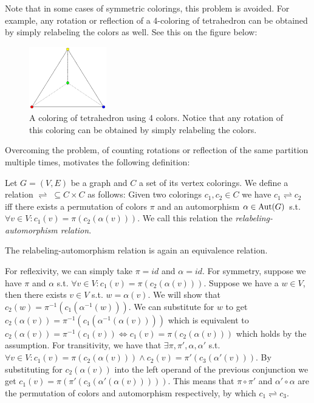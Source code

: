 Note that in some cases of symmetric colorings, this problem is avoided. For example, any rotation or reflection of a 4-coloring of tetrahedron can be obtained by simply relabeling the colors as well. See this on the figure below:

\begin{figure}[H]
    \centering
    \includegraphics[width=0.3\textwidth]{Resources/Figs/example-tetrahedron-4-clring.pdf}
    \caption{A coloring of tetrahedron using 4 colors. Notice that any rotation of this coloring can be obtained by simply relabeling the colors.}
    \label{fig:example-tetrahedron-4-coloring}
\end{figure}

Overcoming the problem, of counting rotations or reflection of the same partition multiple times, motivates the following definition:

\begin{defn}\label{dfn:relabeling-automorphism-relation}
    Let $G=(V,E)$ be a graph and $C$ a set of its vertex colorings. We define a relation $\rightleftharpoons \; \subseteq C \times C$ as follows: Given two colorings $c_1,c_2 \in C$ we have $c_1 \rightleftharpoons c_2$ iff there exists a permutation of colors $\pi$ and an automorphism $\alpha \in \operatorname{Aut}(G)$ s.t. $\forall v \in V : c_1(v) = \pi(c_2(\alpha(v)))$. We call this relation the \emph{relabeling-automorphism relation}.
\end{defn}

The relabeling-automorphism relation is again an equivalence relation. 

For reflexivity, we can simply take $\pi = id$ and $\alpha = id$. For symmetry, suppose we have $\pi$ and $\alpha$ s.t. $\forall v \in V : c_1(v) = \pi(c_2(\alpha(v)))$. Suppose we have a $w \in V$, then there exists $v \in V$ s.t. $w = \alpha(v)$. We will show that $c_2(w) = \pi^{-1}(c_1(\alpha^{-1}(w)))$. We can substitute for $w$ to get $c_2(\alpha(v)) = \pi^{-1}(c_1(\alpha^{-1}(\alpha(v))))$ which is equivalent to $c_2(\alpha(v)) = \pi^{-1}(c_1(v)) \iff c_1(v) = \pi(c_2(\alpha(v)))$ which holds by the assumption. For transitivity, we have that $\exists \pi, \pi', \alpha ,\alpha'$ s.t. $\forall v \in V : c_1(v) = \pi(c_2(\alpha(v))) \wedge c_2(v) = \pi'(c_3(\alpha'(v)))$. By substituting for $c_2(\alpha(v))$ into the left operand of the previous conjunction we get $c_1(v)=\pi(\pi'(c_3(\alpha'(\alpha(v)))))$. This means that $\pi \circ \pi'$ and $\alpha' \circ \alpha$ are the permutation of colors and automorphism respectively, by which $c_1 \rightleftharpoons c_3$.

